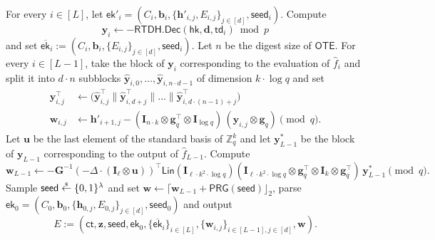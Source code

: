 \documentclass{article}
\newcommand{\ek}{\mathsf{ek}}
\newcommand{\td}{\mathsf{td}}
\newcommand{\getsr}{\overset{\raisebox{-1pt}{$\scriptscriptstyle \$$}}{\gets}}
\newcommand{\sample}{\getsr}
\newcommand{\OTE}{\mathsf{OTE}}
\newcommand{\Z}{\mathbb{Z}}
\renewcommand{\sec}{\ensuremath{\lambda}}
\newcommand{\ct}{\mathsf{ct}}
\newcommand{\RTDH}{\mathsf{RTDH}}
\newcommand{\algofont}[1]{\ensuremath{\mathsf{#1}}}
\newcommand{\Dec}{{\algofont{Dec}}}
\newcommand{\id}{\ensuremath{\mathbf{I}}}
\newcommand{\hk}{\ensuremath{\mathsf{hk}}}
\newenvironment{protocol}[1][]
{\begin{algorithm}\caption{#1}}
  {\end{algorithm}}
\begin{document}
\addtocounter{algocf}{-1}
\begin{protocol}[(cont.)]
  \begin{description}
  \item
    For every $i\in[L]$, let $\ek'_i=(C_i, \mathbf{b}_i, \{\mathbf{h}'_{i, j}, E_{i, j}\}_{j\in[d]}, \mathsf{seed}_i)$. Compute 
\[\mathbf{y}_i\gets -\RTDH.\Dec(\hk, \mathbf{d}, \td_i)\bmod p\]
and set $\overline{\ek}_i:= (C_i, \mathbf{b}_i, \{E_{i, j}\}_{j\in[d]}, \mathsf{seed}_i)$.
 Let $n$ be the digest size of $\OTE$. For every $i\in[L-1]$, take the block of $\mathbf{y}_{i}$ corresponding to the evaluation of $\hat{f}_i$ and split it into $d\cdot n$ subblocks $\hat{\mathbf{y}}_{i, 0}, \dots, \hat{\mathbf{y}}_{i, n\cdot d-1}$ of dimension $k\cdot \log q$ and set
\begin{align*}
\mathbf{y}_{i, j}^\intercal&\gets \bigl(\hat{\mathbf{y}}_{i, j}^\intercal \mathbin{\|} \hat{\mathbf{y}}_{i, d+j}^\intercal \mathbin{\|}\dots \mathbin{\|} \hat{\mathbf{y}}_{i, d\cdot (n-1)+j}^\intercal\bigr)\\
  \mathbf{w}_{i, j}&\gets \mathbf{h}'_{i+1, j}- (\id_{n\cdot k}\otimes \mathbf{g}_q^\intercal\otimes \id_{\log q})\,(\mathbf{y}_{i,j}\otimes \mathbf{g}_q)\pmod q.
\end{align*}                     
Let $\mathbf{u}$ be the last element of the standard basis of $\Z_q^k$ and let $\mathbf{y}^\ast_{L-1}$ be the block of ${\mathbf{y}}_{L-1}$ corresponding to the output of $\hat{f}_{L-1}$. Compute \[ \mathbf{w}_{L-1}\gets -\mathbf{G}^{-1}(-\Delta\cdot (\id_\ell\otimes \mathbf u))^\intercal \mathsf{Lin}(\id_{\ell\cdot k^2\cdot \log q}) (\id_{\ell\cdot k^2\cdot \log q}\otimes \mathbf g_q^\intercal\otimes \id_k\otimes \mathbf g_q^\intercal) \,\mathbf{y}^\ast_{L-1}\pmod q. \]
Sample $\mathsf{seed}\sample\{0, 1\}^\sec$ and set $\mathbf{w}\gets \lceil\mathbf{w}_{L-1}+\mathsf{PRG}(\mathsf{seed})\rfloor_2$, parse $\mathsf{ek}_0=(C_0,\mathbf b_0,\{\mathbf h_{0,j},E_{0,j}\}_{j\in[d]},\mathsf{seed}_0)$ and output \[E:=(\ct, \mathbf{z}, \mathsf{seed}, \ek_0, \{\overline{\ek}_i\}_{i\in[L]}, \{\mathbf{w}_{i, j}\}_{i\in[L-1], j\in[d]}, \mathbf{w}).\]
%


\end{description}
\end{protocol}
\end{document}
